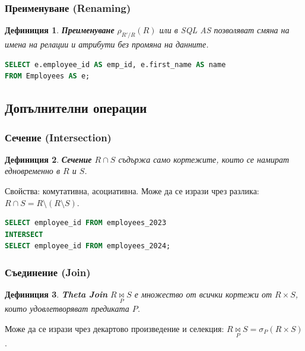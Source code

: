 \documentclass{scrartcl}
\newtheorem{definition}{Дефиниция}
\begin{document}
\begin{FlushLeft}
\subsubsection{Преименуване (Renaming)}

\begin{definition}
\textbf{\textit{Преименуване}} $\rho_{R'/R}(R)$ или в SQL AS позволяват смяна на имена на релации и атрибути без промяна на данните.
\end{definition}

\begin{lstlisting}[language=SQL, caption=Renaming]
SELECT e.employee_id AS emp_id, e.first_name AS name
FROM Employees AS e;
\end{lstlisting}

\subsection{Допълнителни операции}

\subsubsection{Сечение (Intersection)}

\begin{definition}
\textbf{\textit{Сечение}} $R \cap S$ съдържа само кортежите, които се намират едновременно в $R$ и $S$.
\end{definition}

Свойства: комутативна, асоциативна. Може да се изрази чрез разлика: $R \cap S = R \setminus (R \setminus S)$.

\begin{lstlisting}[language=SQL, caption=INTERSECT]
SELECT employee_id FROM employees_2023
INTERSECT
SELECT employee_id FROM employees_2024;
\end{lstlisting}

\subsubsection{Съединение (Join)}

\begin{definition}
\textbf{\textit{Theta Join}} $R \underset{P}{\bowtie} S$ е множество от всички кортежи от $R \times S$, които удовлетворяват предиката $P$.
\end{definition}

Може да се изрази чрез декартово произведение и селекция: $R \underset{P}{\bowtie} S = \sigma_P(R \times S)$.


\end{FlushLeft}
\end{document}
